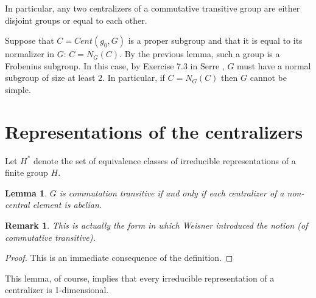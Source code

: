 \documentclass[amsfonts,12pt]{article}
\newtheorem{lemma}[theorem]{Lemma}
\newtheorem{remark}{Remark}
\begin{document}
In particular, any two centralizers of a commutative transitive group
are either disjoint groups or equal to each other.

Suppose that $C=Cent(g_0,G)$ is a proper subgroup
and that it is equal to its normalizer in $G$:
$C=N_G(C)$. By the previous lemma, such a group is 
a Frobenius subgroup. In this case, by Exercise 7.3 
in Serre \cite{Se}, $G$ must have
a normal subgroup of size at least $2$. In particular,
if $C=N_G(C)$ then $G$ cannot be simple.

%


\section{Representations of the centralizers}

 Let $H^*$ denote the set of equivalence classes of 
irreducible representations of a finite group $H$.

\begin{lemma} $G$ is commutation transitive if and only if
each centralizer of a non-central element is abelian.
\end{lemma}

\begin{remark} This is actually the form in which Weisner
introduced the notion (of commutative transitive).
\end{remark}

\begin{proof} This is an immediate consequence of the definition.
\end{proof}

   This lemma, of course, 
implies that every irreducible representation of 
a centralizer is 1-dimensional. 
    
\end{document}
